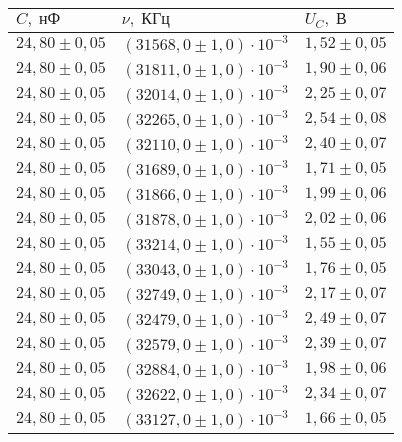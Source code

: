 \begin{tabular}{|l|l|l|}
\hline
$C,\;\text{нФ}$ & $\nu,\;\text{КГц}$ & $U_C,\;\text{В}$\\\hline
$24{,}80 \pm 0{,}05$ & $\left(31568{,}0 \pm 1{,}0\right)\cdot 10^{-3}$ & $1{,}52 \pm 0{,}05$\\\hline
$24{,}80 \pm 0{,}05$ & $\left(31811{,}0 \pm 1{,}0\right)\cdot 10^{-3}$ & $1{,}90 \pm 0{,}06$\\\hline
$24{,}80 \pm 0{,}05$ & $\left(32014{,}0 \pm 1{,}0\right)\cdot 10^{-3}$ & $2{,}25 \pm 0{,}07$\\\hline
$24{,}80 \pm 0{,}05$ & $\left(32265{,}0 \pm 1{,}0\right)\cdot 10^{-3}$ & $2{,}54 \pm 0{,}08$\\\hline
$24{,}80 \pm 0{,}05$ & $\left(32110{,}0 \pm 1{,}0\right)\cdot 10^{-3}$ & $2{,}40 \pm 0{,}07$\\\hline
$24{,}80 \pm 0{,}05$ & $\left(31689{,}0 \pm 1{,}0\right)\cdot 10^{-3}$ & $1{,}71 \pm 0{,}05$\\\hline
$24{,}80 \pm 0{,}05$ & $\left(31866{,}0 \pm 1{,}0\right)\cdot 10^{-3}$ & $1{,}99 \pm 0{,}06$\\\hline
$24{,}80 \pm 0{,}05$ & $\left(31878{,}0 \pm 1{,}0\right)\cdot 10^{-3}$ & $2{,}02 \pm 0{,}06$\\\hline
$24{,}80 \pm 0{,}05$ & $\left(33214{,}0 \pm 1{,}0\right)\cdot 10^{-3}$ & $1{,}55 \pm 0{,}05$\\\hline
$24{,}80 \pm 0{,}05$ & $\left(33043{,}0 \pm 1{,}0\right)\cdot 10^{-3}$ & $1{,}76 \pm 0{,}05$\\\hline
$24{,}80 \pm 0{,}05$ & $\left(32749{,}0 \pm 1{,}0\right)\cdot 10^{-3}$ & $2{,}17 \pm 0{,}07$\\\hline
$24{,}80 \pm 0{,}05$ & $\left(32479{,}0 \pm 1{,}0\right)\cdot 10^{-3}$ & $2{,}49 \pm 0{,}07$\\\hline
$24{,}80 \pm 0{,}05$ & $\left(32579{,}0 \pm 1{,}0\right)\cdot 10^{-3}$ & $2{,}39 \pm 0{,}07$\\\hline
$24{,}80 \pm 0{,}05$ & $\left(32884{,}0 \pm 1{,}0\right)\cdot 10^{-3}$ & $1{,}98 \pm 0{,}06$\\\hline
$24{,}80 \pm 0{,}05$ & $\left(32622{,}0 \pm 1{,}0\right)\cdot 10^{-3}$ & $2{,}34 \pm 0{,}07$\\\hline
$24{,}80 \pm 0{,}05$ & $\left(33127{,}0 \pm 1{,}0\right)\cdot 10^{-3}$ & $1{,}66 \pm 0{,}05$\\\hline
\end{tabular}
